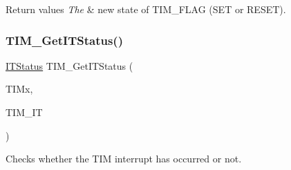 \begin{DoxyRetVals}{Return values}
{\em The} & new state of T\+I\+M\+\_\+\+F\+L\+AG (S\+ET or R\+E\+S\+ET). \\
\hline
\end{DoxyRetVals}
\mbox{\label{group___t_i_m___exported___functions_ga0827a0b411707304f76d33050727c24d}} 
\subsubsection{\texorpdfstring{TIM\_GetITStatus()}{TIM\_GetITStatus()}}
{\footnotesize\ttfamily \mbox{\hyperlink{group___exported__types_gaacbd7ed539db0aacd973a0f6eca34074}{I\+T\+Status}} T\+I\+M\+\_\+\+Get\+I\+T\+Status (\begin{DoxyParamCaption}\item[{\mbox{\hyperlink{struct_t_i_m___type_def}{T\+I\+M\+\_\+\+Type\+Def}} $\ast$}]{T\+I\+Mx,  }\item[{uint16\+\_\+t}]{T\+I\+M\+\_\+\+IT }\end{DoxyParamCaption})}



Checks whether the T\+IM interrupt has occurred or not. 


